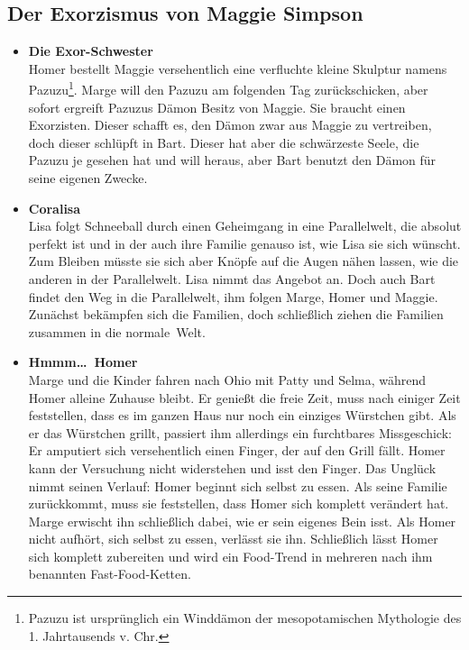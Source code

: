 \subsection{Der Exorzismus von Maggie Simpson}
\begin{itemize}
  \item \textbf{Die Exor-Schwester}\\ Homer bestellt Maggie versehentlich eine verfluchte kleine Skulptur namens Pazuzu\footnote{Pazuzu ist ursprünglich ein Winddämon der mesopotamischen Mythologie des 1. Jahrtausends v. Chr.}. Marge will den Pazuzu am folgenden Tag zurückschicken, aber sofort ergreift Pazuzus Dämon Besitz von Maggie. Sie braucht einen Exorzisten. Dieser schafft es, den Dämon zwar aus Maggie zu vertreiben, doch dieser schlüpft in Bart. Dieser hat aber die schwärzeste Seele, die Pazuzu je gesehen hat und will heraus, aber Bart benutzt den Dämon für seine eigenen Zwecke. 
  \item \textbf{Coralisa}\\ Lisa folgt Schneeball durch einen Geheimgang in eine Parallelwelt, die absolut perfekt ist und in der auch ihre Familie genauso ist, wie Lisa sie sich wünscht. Zum Bleiben müsste sie sich aber Knöpfe auf die Augen nähen lassen, wie die anderen in der Parallelwelt. Lisa nimmt das Angebot an. Doch auch Bart findet den Weg in die Parallelwelt, ihm folgen Marge, Homer und Maggie. Zunächst bekämpfen sich die Familien, doch schließlich ziehen die Familien zusammen in die \glqq normale\grqq\ Welt. 
  \item \textbf{Hmmm\dots\ Homer}\\ Marge und die Kinder fahren nach Ohio mit Patty und Selma, während Homer alleine Zuhause bleibt. Er genießt die freie Zeit, muss nach einiger Zeit feststellen, dass es im ganzen Haus nur noch ein einziges Würstchen gibt. Als er das Würstchen grillt, passiert ihm allerdings ein furchtbares Missgeschick: Er amputiert sich versehentlich einen Finger, der auf den Grill fällt. Homer kann der Versuchung nicht widerstehen und isst den Finger. Das Unglück nimmt seinen Verlauf: Homer beginnt sich selbst zu essen. Als seine Familie zurückkommt, muss sie feststellen, dass Homer sich komplett verändert hat. Marge erwischt ihn schließlich dabei, wie er sein eigenes Bein isst. Als Homer nicht aufhört, sich selbst zu essen, verlässt sie ihn. Schließlich lässt Homer sich komplett zubereiten und wird ein Food-Trend in mehreren nach ihm benannten Fast-Food-Ketten. 
\end{itemize}

